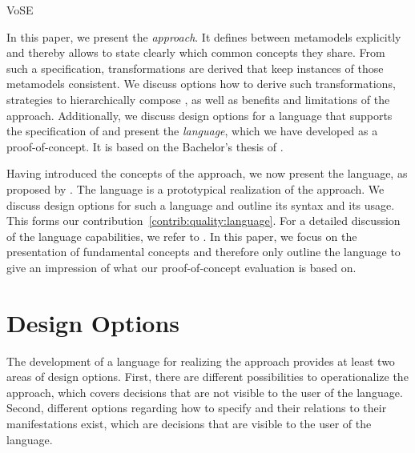 \begin{copiedFrom}{VoSE}

In this paper, we present the \emph{\commonalities approach}. %
It defines \commonalities between metamodels explicitly and thereby allows to state clearly which common concepts they share.
From such a specification, transformations are derived that keep instances of those metamodels consistent.
We discuss options how to derive such transformations, strategies to hierarchically compose \commonalities, as well as benefits and limitations of the approach.
Additionally, we discuss design options for a language that supports the specification of \commonalities and present the \emph{\commonalities language}, which we have developed as a proof-of-concept.
It is based on the Bachelor's thesis of \textcite{gleitze2017a}.

Having introduced the concepts of the \commonalities approach, we now present the \commonalities language, as proposed by \textcite{gleitze2017a}.
The language is a prototypical realization of the approach.
We discuss design options for such a language and outline its syntax and its usage.
This forms our contribution~\autoref{contrib:quality:language}.
For a detailed discussion of the language capabilities, we refer to \cite{gleitze2017a}.
In this paper, we focus on the presentation of fundamental concepts  and therefore only outline the language to give an impression of what our proof-of-concept evaluation is based on.


\section{Design Options}

The development of a language for realizing the \commonalities approach provides at least two areas of design options.
First, there are different possibilities to operationalize the approach, which covers decisions that are not visible to the user of the language.
Second, different options regarding how to specify \conceptmetamodels and their relations to their manifestations exist, which are decisions that are visible to the user of the language.


\end{copiedFrom}
